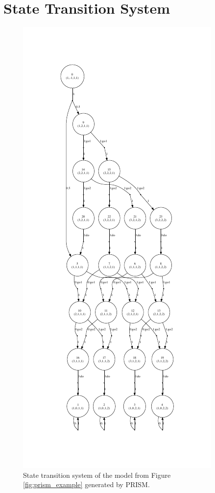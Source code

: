 \documentclass{llncs}
\begin{document}
\section{State Transition System} \label{app:transitions}
\begin{figure}
  \centering
  \vspace{-50pt}
	\includegraphics[]{images/transition_system}
	\vspace{-35pt}
	\caption{State transition system of the model from Figure \ref{fig:prism_example} generated by PRISM.}
\end{figure}
\end{document}
